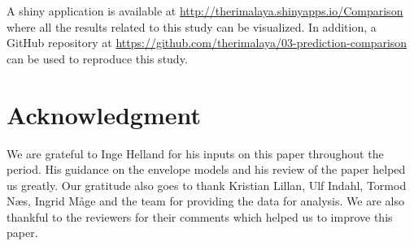 \documentclass[review]{elsarticle}
\begin{document}
A shiny application \citep{shiny} is available at \url{http://therimalaya.shinyapps.io/Comparison} where all the results related to this study can be visualized. In addition, a GitHub repository at \url{https://github.com/therimalaya/03-prediction-comparison} can be used to reproduce this study.

\hypertarget{acknowledgment}{%
\section{Acknowledgment}\label{acknowledgment}}

We are grateful to Inge Helland for his inputs on this paper throughout the period. His guidance on the envelope models and his review of the paper helped us greatly. Our gratitude also goes to thank Kristian Lillan, Ulf Indahl, Tormod Næs, Ingrid Måge and the team for providing the data for analysis. We are also thankful to the reviewers for their comments which helped us to improve this paper.

\hypertarget{refs}{}

\hypertarget{appendix-appendix-a}{%
\appendix}



\renewcommand\refname{References}

\end{document}
